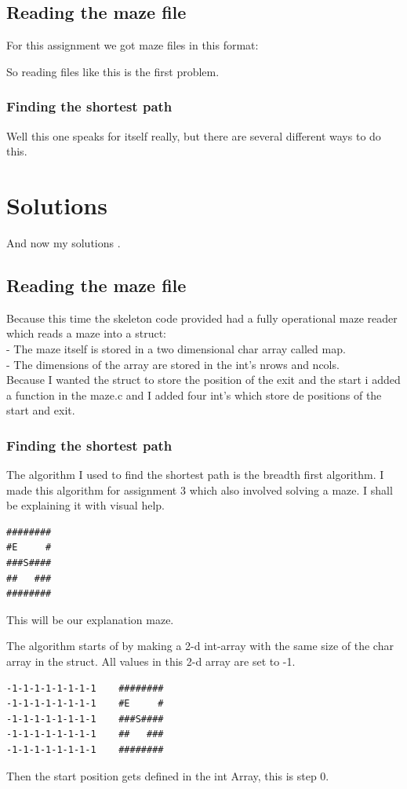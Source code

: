 \documentclass[pdftex,12pt,a4paper]{article}
\begin{document}
\subsection{Reading the maze file}
For this assignment we got maze files in this format:

So reading files like this is the first problem.
\subsubsection{Finding the shortest path}
Well this one speaks for itself really, but there are several different ways to do this.

\section{Solutions}
And now my solutions .
\subsection{Reading the maze file}
Because this time the skeleton code provided had a fully operational maze reader which reads a maze into a struct:\\
- The maze itself is stored in a two dimensional char array called map.\\
- The dimensions of the array are stored in the int's nrows and ncols.\\
Because I wanted the struct to store the position of the exit and the start i added a function in the maze.c and I added four int's which store de positions of the start and exit. 

\subsubsection{Finding the shortest path}
The algorithm I used to find the shortest path is the breadth first algorithm. I made this algorithm for assignment 3 which also involved solving a maze. I shall be explaining it with visual help.
\begin{verbatim}
########
#E     #
###S####
##   ###
########
\end{verbatim}
This will be our explanation maze.

The algorithm starts of by making a 2-d int-array with the same size of the char array in the struct. All values in this 2-d array are set to -1.
\begin{verbatim}
-1-1-1-1-1-1-1-1	########
-1-1-1-1-1-1-1-1	#E     #
-1-1-1-1-1-1-1-1	###S####
-1-1-1-1-1-1-1-1	##   ###
-1-1-1-1-1-1-1-1	########
\end{verbatim}
Then the start position gets defined in the int Array, this is step 0.
\end{document}
